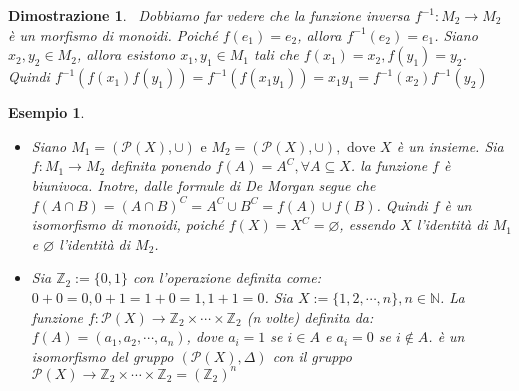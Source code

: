 \documentclass[a4paper,12pt]{article}
\theoremstyle{def}
\theoremstyle{prop}
\theoremstyle{esempio}
\newtheorem*{example}{Esempio}
\theoremstyle{dimostrazione}
\newtheorem*{dimostrazione}{Dimostrazione}
\theoremstyle{teo}
\theoremstyle{osservazione}
\begin{document}
\begin{dimostrazione}
    \
    Dobbiamo far vedere che la funzione inversa \(f^{-1} : M_2 \rightarrow M_2\) è un morfismo di monoidi.
    Poiché \(f(e_1) = e_2\), allora \(f^{-1}(e_2) = e_1\). Siano \(x_2,y_2 \in M_2\), allora esistono
    \(x_1,y_1 \in M_1\) tali che \(f(x_1)=x_2 , f(y_1)=y_2\). Quindi \(f^{-1} (f(x_1)f(y_1)) = f^{-1}(f(x_1 y_1))
    = x_1 y_1 = f^{-1}(x_2) f^{-1}(y_2)\)
\end{dimostrazione}

\begin{example}
    \
    \begin{itemize}
        \item Siano \(M_1 = (\mathcal{P}(X), \cup) \text{ e } M_2 = (\mathcal{P}(X), \cup), \text{ dove } X\)
              è un insieme. Sia \(f : M_1 \rightarrow M_2\) definita ponendo \(f(A) = A^C , \forall A \subseteq X\).
              la funzione \(f\) è biunivoca. Inotre, dalle formule di De Morgan segue che \(f(A \cap B) =
              (A \cap B)^C = A^C \cup B^C = f(A) \cup f(B)\). Quindi \(f\) è un isomorfismo di monoidi, poiché
              \(f(X) = X^C = \varnothing\), essendo \(X\) l'identità di \(M_1\) e \(\varnothing\) l'identità di \(M_2\).
        \item Sia \(\mathbb{Z}_2 := \{0,1\}\) con l'operazione definita come: \(0+0=0, 0+1=1+0=1, 1+1=0\).
              Sia \(X := \{1,2,\cdots,n\}, n \in \mathbb{N}\). La funzione \(f: \mathcal{P}(X) \rightarrow
              \mathbb{Z}_2 \times \cdots \times \mathbb{Z}_2\) (n volte) definita da: \(f(A) = (a_1,a_2,\cdots,a_n)\),
              dove \(a_i = 1\) se \(i \in A\) e \(a_i = 0\) se \(i \notin A\). \newline è un isomorfismo del gruppo
              \((\mathcal{P}(X), \Delta)\) con il gruppo \(\mathcal{P}(X) \rightarrow \mathbb{Z}_2 \times \cdots
              \times \mathbb{Z}_2 = (\mathbb{Z}_2)^n\)
    \end{itemize}
\end{example}
\end{document}
